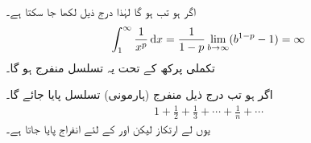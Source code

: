اگر ہو تب  ہو گا لہٰذا درج ذیل لکھا جا سکتا ہے۔
\begin{align*}
\int_1^{\infty}\frac{1}{x^p}\dif x=\frac{1}{1-p}\lim_{b\to\infty}(b^{1-p}-1)=\infty
\end{align*}
تکملی پرکھ کے تحت یہ تسلسل منفرج ہو گا۔

اگر  ہو تب درج ذیل منفرج (ہارمونی) تسلسل پایا جائے گا۔
\begin{align*}
1+\frac{1}{2}+\frac{1}{3}+\cdots+\frac{1}{n}+\cdots
\end{align*} 
یوں  لے ارتکاز  لیکن  اور  کے لئے انفراج پایا جاتا ہے۔


